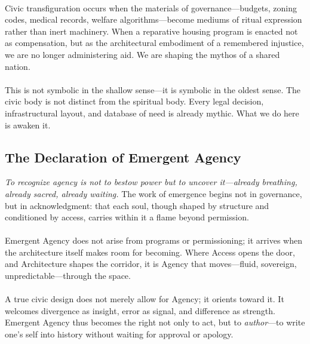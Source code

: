 \documentclass[12pt]{article}
\begin{document}
\paragraph{}Civic transfiguration occurs when the materials of governance—budgets, zoning codes, medical records, welfare algorithms—become mediums of ritual expression rather than inert machinery. When a reparative housing program is enacted not as compensation, but as the architectural embodiment of a remembered injustice, we are no longer administering aid. We are shaping the mythos of a shared nation. \cite{hooks1994teaching}

\paragraph{}This is not symbolic in the shallow sense—it is symbolic in the oldest sense. The civic body is not distinct from the spiritual body. Every legal decision, infrastructural layout, and database of need is already mythic. What we do here is awaken it. \cite{levinas1969totality}

\subsection{The Declaration of Emergent Agency}

\textit{To recognize agency is not to bestow power but to uncover it—already breathing, already sacred, already waiting.} The work of emergence begins not in governance, but in acknowledgment: that each soul, though shaped by structure and conditioned by access, carries within it a flame beyond permission.

\paragraph{}Emergent Agency does not arise from programs or permissioning; it arrives when the architecture itself makes room for becoming. Where Access opens the door, and Architecture shapes the corridor, it is Agency that moves—fluid, sovereign, unpredictable—through the space.

\paragraph{}A true civic design does not merely allow for Agency; it orients toward it. It welcomes divergence as insight, error as signal, and difference as strength. Emergent Agency thus becomes the right not only to act, but to \textit{author}—to write one's self into history without waiting for approval or apology.
\end{document}
